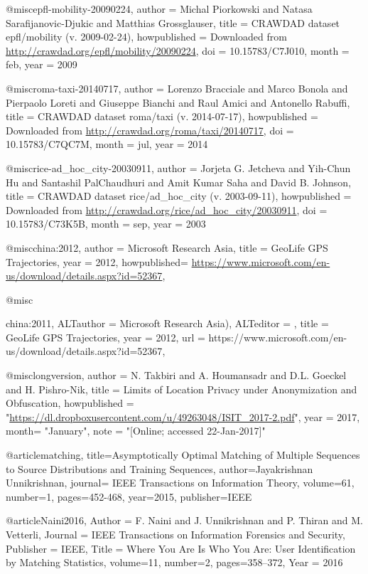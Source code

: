 {{%


@misc{epfl-mobility-20090224,
	author = {Michal Piorkowski and Natasa Sarafijanovic-Djukic and Matthias Grossglauser},
	title = {{CRAWDAD} dataset epfl/mobility (v. 2009-02-24)},
	howpublished = {Downloaded from \url{http://crawdad.org/epfl/mobility/20090224}},
	doi = {10.15783/C7J010},
	month = feb,
	year = 2009
}

@misc{roma-taxi-20140717,
	author = {Lorenzo Bracciale and Marco Bonola and Pierpaolo Loreti and Giuseppe Bianchi and Raul Amici and Antonello Rabuffi},
	title = {{CRAWDAD} dataset roma/taxi (v. 2014-07-17)},
	howpublished = {Downloaded from \url{http://crawdad.org/roma/taxi/20140717}},
	doi = {10.15783/C7QC7M},
	month = jul,
	year = 2014
}

@misc{rice-ad_hoc_city-20030911,
	author = {Jorjeta G. Jetcheva and Yih-Chun Hu and Santashil PalChaudhuri and Amit Kumar Saha and David B. Johnson},
	title = {{CRAWDAD} dataset rice/ad\_hoc\_city (v. 2003-09-11)},
	howpublished = {Downloaded from \url{http://crawdad.org/rice/ad_hoc_city/20030911}},
	doi = {10.15783/C73K5B},
	month = sep,
	year = 2003
}

@misc{china:2012,
	author = {Microsoft Research Asia},
	title = {GeoLife GPS Trajectories},
	year = {2012},
	howpublished= {\url{https://www.microsoft.com/en-us/download/details.aspx?id=52367}},
}


@misc{china:2011,
	ALTauthor = {Microsoft Research Asia)},
	ALTeditor = {},
	title = {GeoLife GPS Trajectories,
	year = {2012},
	url = {https://www.microsoft.com/en-us/download/details.aspx?id=52367},
	}
	
	
	@misc{longversion,
	author = {N. Takbiri and A. Houmansadr and D.L. Goeckel and H. Pishro-Nik},
	title = {{Limits of Location Privacy under Anonymization and Obfuscation}},
	howpublished = "\url{https://dl.dropboxusercontent.com/u/49263048/ISIT_2017-2.pdf}",
	year = 2017,
	month= "January",
	note = "[Online; accessed 22-Jan-2017]"
	}
	
	
	
	@article{matching,
	title={Asymptotically Optimal Matching of Multiple Sequences to Source Distributions and Training Sequences},
	author={Jayakrishnan Unnikrishnan},
	journal={ IEEE Transactions on Information Theory},
	volume={61},
	number={1},
	pages={452-468},
	year={2015},
	publisher={IEEE}
	}
	
	
	@article{Naini2016,
	Author = {F. Naini and J. Unnikrishnan and P. Thiran and M. Vetterli},
	Journal = {IEEE Transactions on Information Forensics and Security},
	Publisher = {IEEE},
	Title = {Where You Are Is Who You Are: User Identification by Matching Statistics},
	volume={11},
	number={2},
	pages={358--372},
	Year = {2016}
	}
	
}}}
